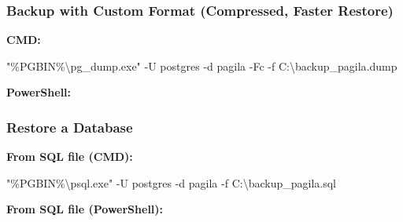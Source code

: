 \documentclass[
  letterpaper,
  DIV=11,
  numbers=noendperiod]{scrartcl}
\newenvironment{Shaded}{\begin{snugshade}}{\end{snugshade}}
\newcommand{\AttributeTok}[1]{\textcolor[rgb]{0.40,0.45,0.13}{#1}}
\newcommand{\FunctionTok}[1]{\textcolor[rgb]{0.28,0.35,0.67}{#1}}
\newcommand{\NormalTok}[1]{\textcolor[rgb]{0.00,0.23,0.31}{#1}}
\newcommand{\OperatorTok}[1]{\textcolor[rgb]{0.37,0.37,0.37}{#1}}
\newcommand{\PreprocessorTok}[1]{\textcolor[rgb]{0.68,0.00,0.00}{#1}}
\newcommand{\StringTok}[1]{\textcolor[rgb]{0.13,0.47,0.30}{#1}}
\newcommand{\VariableTok}[1]{\textcolor[rgb]{0.07,0.07,0.07}{#1}}
\begin{document}
\subsubsection{Backup with Custom Format (Compressed, Faster
Restore)}\label{backup-with-custom-format-compressed-faster-restore}

\textbf{CMD:}

\begin{Shaded}
\begin{Highlighting}[]
\StringTok{"}\PreprocessorTok{\%}\VariableTok{PGBIN}\PreprocessorTok{\%}\StringTok{\textbackslash{}pg\_dump.exe"}\NormalTok{ {-}U postgres }\AttributeTok{{-}d}\NormalTok{ pagila }\AttributeTok{{-}Fc} \AttributeTok{{-}f}\NormalTok{ C:\textbackslash{}backup\_pagila.dump}
\end{Highlighting}
\end{Shaded}

\textbf{PowerShell:}

\begin{Shaded}
\end{Shaded}

\subsubsection{Restore a Database}\label{restore-a-database}

\textbf{From SQL file (CMD):}

\begin{Shaded}
\begin{Highlighting}[]
\StringTok{"}\PreprocessorTok{\%}\VariableTok{PGBIN}\PreprocessorTok{\%}\StringTok{\textbackslash{}psql.exe"}\NormalTok{ {-}U postgres }\AttributeTok{{-}d}\NormalTok{ pagila }\AttributeTok{{-}f}\NormalTok{ C:\textbackslash{}backup\_pagila.sql}
\end{Highlighting}
\end{Shaded}

\textbf{From SQL file (PowerShell):}

\begin{Shaded}
\end{Shaded}
\end{document}
